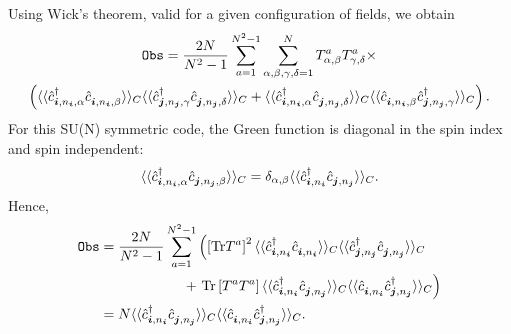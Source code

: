 Using Wick's theorem, valid for a given configuration of fields, we obtain
\begin{multline}
 \texttt{Obs} =   \frac{2N}{N^2-1}\sum_{a=1}^{N^2 - 1}   \sum_{\alpha,\beta,\gamma, \delta = 1}^{N}     T^a_{\alpha,\beta}  T^a_{\gamma,\delta}   \times  \\
  \left( \langle \langle \hat{c}^{\dagger}_{\vec{i},n_{\ve{i}},\alpha} \hat{c}^{\phantom\dagger}_{\vec{i},n_{\ve{i}}, \beta }  \rangle\rangle_C  \langle \langle     \hat{c}^{\dagger}_{\vec{j}, n_{\ve{j}},\gamma}  \hat{c}^{\phantom\dagger}_{\vec{j},n_{\ve{j}},\delta}\rangle\rangle_C        +  
  \langle \langle \hat{c}^{\dagger}_{\vec{i},  n_{\ve{i}},\alpha}   \hat{c}^{\phantom\dagger}_{\vec{j},  n_{\ve{j}},\delta}\rangle\rangle_C  \langle \langle   \hat{c}^{\phantom\dagger}_{\vec{i},   n_{\ve{i}}, \beta }   \hat{c}^{\dagger}_{\vec{j},   n_{\ve{j}}, \gamma} \rangle\rangle_C 
   \right).
\end{multline}
For this SU(N) symmetric code, the  Green function  is diagonal  in the spin  index and spin independent: 
\begin{equation}
 \langle \langle \hat{c}^{\dagger}_{\boldsymbol{i},  n_{\boldsymbol{i}},\alpha} \hat{c}^{}_{\boldsymbol{j},  n_{\boldsymbol{j}}, \beta }  \rangle\rangle_C  =  \delta_{\alpha,\beta}  \langle \langle \hat{c}^{\dagger}_{\boldsymbol{i},  n_{\boldsymbol{i}}} \hat{c}^{}_{\boldsymbol{j} ,  n_{\boldsymbol{j}}}  \rangle\rangle_C.
\end{equation}
Hence, 
\begin{align}
 \texttt{Obs} &= \begin{multlined}[t] \frac{2N}{N^2-1}\sum_{a=1}^{N^2 - 1} \left(   
\left[   \text{Tr} T^{a}\right]^2 \langle \langle \hat{c}^{\dagger}_{\vec{i},  n_{\ve{i}} } \hat{c}^{\phantom\dagger}_{\vec{i} ,  n_{\ve{i}}}  \rangle\rangle_C       \langle \langle \hat{c}^{\dagger}_{\vec{j} ,  n_{\ve{j}}} \hat{c}^{\phantom\dagger}_{\vec{j} ,  n_{\ve{j}}}  \rangle\rangle_C   \right.\\   
 + \left.   \text{Tr}\left[ T^{a}  T^{a} \right]    \langle \langle \hat{c}^{\dagger}_{\vec{i},  n_{\ve{i}}}   \hat{c}^{\phantom\dagger}_{\vec{j},  n_{\ve{j}}}\rangle\rangle_C  \langle \langle   \hat{c}^{\phantom\dagger}_{\vec{i},  n_{\ve{i}}}   \hat{c}^{\dagger}_{\vec{j},  n_{\ve{j}}} \rangle\rangle_C  \right)   \end{multlined}
 \nonumber \\
&=   N       \langle \langle \hat{c}^{\dagger}_{\vec{i},  n_{\ve{i}}}   \hat{c}^{\phantom\dagger}_{\vec{j},  n_{\ve{j}}}\rangle\rangle_C  \langle \langle   \hat{c}^{\phantom\dagger}_{\vec{i},  n_{\ve{i}}}   \hat{c}^{\dagger}_{\vec{j},  n_{\ve{j}}} \rangle\rangle_C .
\end{align}

